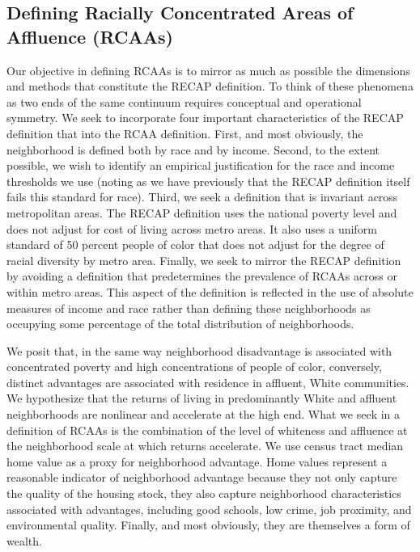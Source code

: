 \documentclass[11pt,]{article}
\begin{document}
\hypertarget{defining-racially-concentrated-areas-of-affluence-rcaas}{%
\subsection{Defining Racially Concentrated Areas of Affluence
(RCAAs)}\label{defining-racially-concentrated-areas-of-affluence-rcaas}}

Our objective in defining RCAAs is to mirror as much as possible the
dimensions and methods that constitute the RECAP definition. To think of
these phenomena as two ends of the same continuum requires conceptual
and operational symmetry. We seek to incorporate four important
characteristics of the RECAP definition that into the RCAA definition.
First, and most obviously, the neighborhood is defined both by race and
by income. Second, to the extent possible, we wish to identify an
empirical justification for the race and income thresholds we use
(noting as we have previously that the RECAP definition itself fails
this standard for race). Third, we seek a definition that is invariant
across metropolitan areas. The RECAP definition uses the national
poverty level and does not adjust for cost of living across metro areas.
It also uses a uniform standard of 50 percent people of color that does
not adjust for the degree of racial diversity by metro area. Finally, we
seek to mirror the RECAP definition by avoiding a definition that
predetermines the prevalence of RCAAs across or within metro areas. This
aspect of the definition is reflected in the use of absolute measures of
income and race rather than defining these neighborhoods as occupying
some percentage of the total distribution of neighborhoods.

We posit that, in the same way neighborhood disadvantage is associated
with concentrated poverty and high concentrations of people of color,
conversely, distinct advantages are associated with residence in
affluent, White communities. We hypothesize that the returns of living
in predominantly White and affluent neighborhoods are nonlinear and
accelerate at the high end. What we seek in a definition of RCAAs is the
combination of the level of whiteness and affluence at the neighborhood
scale at which returns accelerate. We use census tract median home value
as a proxy for neighborhood advantage. Home values represent a
reasonable indicator of neighborhood advantage because they not only
capture the quality of the housing stock, they also capture neighborhood
characteristics associated with advantages, including good schools, low
crime, job proximity, and environmental quality. Finally, and most
obviously, they are themselves a form of wealth.
\end{document}
